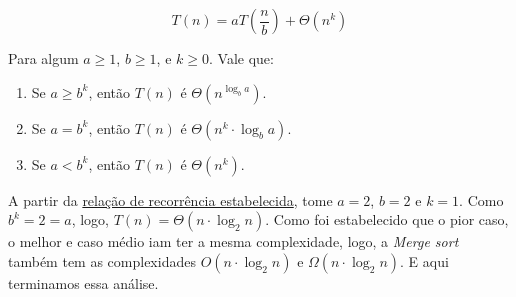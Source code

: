 $$
	T(n) = aT\left(\frac{n}{b}\right) + \Theta\left(n^{k}\right)
$$

Para algum $a \geq 1$, $b \geq 1$, e $k \geq 0$. Vale que:

\begin{enumerate}
	\item Se $a \geq b^k$, então $T(n)$ é $\Theta(n^{\log_b a})$.
	\item Se $a = b^k$, então $T(n)$ é $\Theta(n^k \cdot \log_b a)$.
	\item Se $a < b^k$, então $T(n)$ é $\Theta(n^k)$.
\end{enumerate}

A partir da \href{recc:rec_merge_sort}{relação de recorrência estabelecida}, tome $a = 2$, $b = 2$ e $k = 1$. Como $b^k = 2 = a$, logo, $T(n) = \Theta(n \cdot \log_2 n)$. Como foi estabelecido que o pior caso, o melhor e caso médio iam ter a mesma complexidade, logo, a \textit{Merge sort} também tem as complexidades $O(n \cdot \log_2 n)$ e $\Omega(n \cdot \log_2 n)$. E aqui terminamos essa análise.

